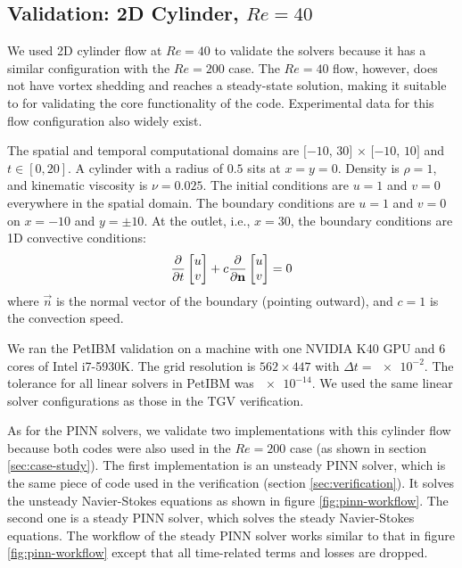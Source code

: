 
\subsection{Validation: 2D Cylinder, $Re=\num{40}$}\label{sec:val_2d_cylinder_re40}

We used 2D cylinder flow at $Re=40$ to validate the solvers because it has a similar configuration with the $Re=200$ case.
The $Re=40$ flow, however, does not have vortex shedding and reaches a steady-state solution, making it suitable to for validating the core functionality of the code.
Experimental data for this flow configuration also widely exist.

The spatial and temporal computational domains are $[-10$, $30]$ $\times$ $[-10$, $10]$ and $t \in [0, 20]$.
A cylinder with a radius of $0.5$ sits at $x=y=0$.
Density is $\rho=1$, and kinematic viscosity is $\nu=0.025$.
The initial conditions are $u=1$ and $v=0$ everywhere in the spatial domain.
The boundary conditions are $u=1$ and $v=0$ on $x=-10$ and $y=\pm 10$.
At the outlet, i.e., $x=30$, the boundary conditions are 1D convective conditions:
\begin{equation}\label{eq:convec-bc}
    \frac{\partial }{\partial t}\begin{bmatrix} u \\ v \end{bmatrix}
    +
    c\frac{\partial }{\partial \mathbf{n}}\begin{bmatrix} u \\ v \end{bmatrix} = 0
\end{equation}
where $\vec{n}$ is the normal vector of the boundary (pointing outward), and $c=1$ is the convection speed.

We ran the PetIBM validation on a machine with one NVIDIA K40 GPU and 6 cores of Intel i7-5930K.
The grid resolution is $562 \times 447$ with $\Delta t=\num{e-2}$.
The tolerance for all linear solvers in PetIBM was $\num{e-14}$.
We used the same linear solver configurations as those in the TGV verification.

As for the PINN solvers, we validate two implementations with this cylinder flow because both codes were also used in the $Re=200$ case (as shown in section \ref{sec:case-study}).
The first implementation is an unsteady PINN solver, which is the same piece of code used in the verification (section \ref{sec:verification}).
It solves the unsteady Navier-Stokes equations as shown in figure \ref{fig:pinn-workflow}.
The second one is a steady PINN solver, which solves the steady Navier-Stokes equations.
The workflow of the steady PINN solver works similar to that in figure \ref{fig:pinn-workflow} except that all time-related terms and losses are dropped.

